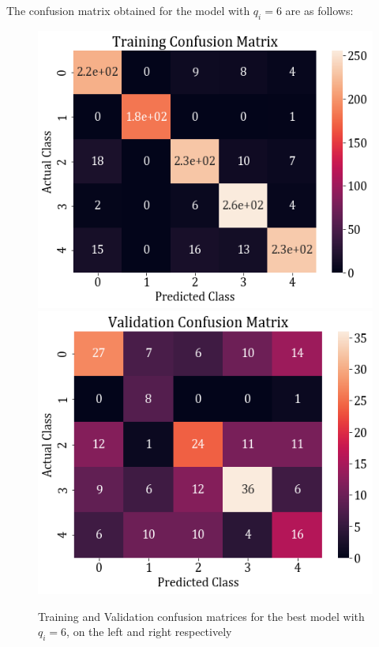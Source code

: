 \documentclass[11pt,a4paper]{article}
\newcommand{\noi}{\noindent}
\begin{document}
\noi
The confusion matrix obtained for the model with $q_i=6$ are as follows:
\begin{figure}[H]
    \includegraphics[scale=0.5]{images/2a_full_train_conf.png}
    \includegraphics[scale=0.5]{images/2a_full_val_conf.png}
    \caption{Training and Validation confusion matrices for the best model with $q_i=6$, on the left and right respectively}
\end{figure}
\end{document}
